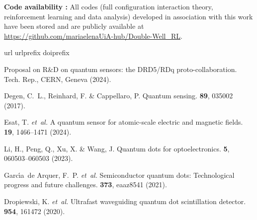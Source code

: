 \documentclass[fleqn,10pt]{wlscirep}
\begin{document}
\medskip
\noindent \textbf{Code availability :}
All codes (full configuration interaction theory, reinforcement learning and data analysis) developed in association with this work have been stored and are publicly available  at \url{https://github.com/mariaelenaUiA-hub/Double-Well_RL}. 

\begin{thebibliography}{10}
\expandafter\ifx\csname url\endcsname\relax
  \def\url#1{\texttt{#1}}\fi
\expandafter\ifx\csname urlprefix\endcsname\relax\def\urlprefix{URL }\fi
\expandafter\ifx\csname doiprefix\endcsname\relax\def\doiprefix{DOI: }\fi
\providecommand{\bibinfo}[2]{#2}
\providecommand{\eprint}[2][]{\url{#2}}

\bibinfo{title}{{Proposal on R\&D on quantum sensors: the DRD5/RDq
  proto-collaboration}}.
\newblock \bibinfo{type}{Tech. Rep.}, \bibinfo{institution}{CERN},
  \bibinfo{address}{Geneva} (\bibinfo{year}{2024}).

\bibinfo{author}{Degen, C.~L.}, \bibinfo{author}{Reinhard, F.} \&
  \bibinfo{author}{Cappellaro, P.}
\newblock \bibinfo{journal}{\bibinfo{title}{Quantum sensing}}.
  \textbf{\bibinfo{volume}{89}}, \bibinfo{pages}{035002}
  (\bibinfo{year}{2017}).

\bibinfo{author}{Esat, T.} \emph{et~al.}
\newblock \bibinfo{journal}{\bibinfo{title}{A quantum sensor for atomic-scale
  electric and magnetic fields}}.
  \textbf{\bibinfo{volume}{19}}, \bibinfo{pages}{1466--1471}
  (\bibinfo{year}{2024}).

\bibinfo{author}{Li, H.}, \bibinfo{author}{Peng, Q.}, \bibinfo{author}{Xu, X.}
  \& \bibinfo{author}{Wang, J.}
\newblock \bibinfo{journal}{\bibinfo{title}{Quantum dots for optoelectronics}}.
 \textbf{\bibinfo{volume}{5}},
  \bibinfo{pages}{060503--060503} (\bibinfo{year}{2023}).

\bibinfo{author}{Garc{\'\i}a~de Arquer, F.~P.} \emph{et~al.}
\newblock \bibinfo{journal}{\bibinfo{title}{Semiconductor quantum dots:
  Technological progress and future challenges}}.
 \textbf{\bibinfo{volume}{373}},
  \bibinfo{pages}{eaaz8541} (\bibinfo{year}{2021}).

\bibinfo{author}{Dropiewski, K.} \emph{et~al.}
\newblock \bibinfo{journal}{\bibinfo{title}{Ultrafast waveguiding quantum dot
  scintillation detector}}.
  \textbf{\bibinfo{volume}{954}}, \bibinfo{pages}{161472}
  (\bibinfo{year}{2020}).


\end{thebibliography}
\end{document}
